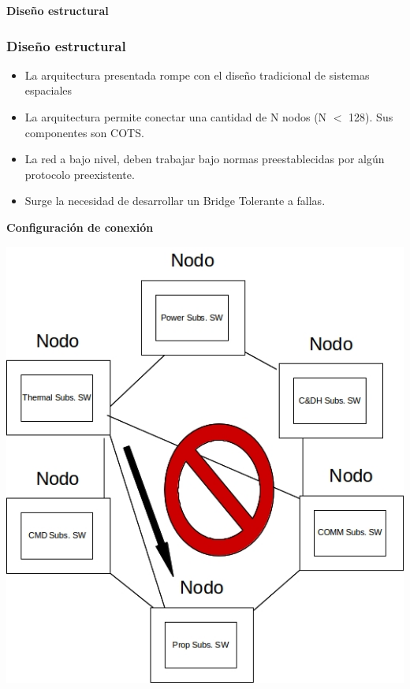 \begin{frame}[c]
	\centering
	\LARGE \textbf{Diseño estructural}
\end{frame}

\begin{frame}
	\frametitle{Diseño estructural}
	\begin{itemize}
		\item La arquitectura presentada rompe con el diseño tradicional de sistemas espaciales
		\item La arquitectura permite conectar una cantidad de N nodos (N $<$ 128). Sus componentes son COTS. 
		\item La red a bajo nivel, deben trabajar bajo normas preestablecidas por algún protocolo preexistente. 
		\item Surge la necesidad de desarrollar un Bridge Tolerante a fallas. 
	\end{itemize}
\end{frame}

\begin{frame}[c]
	\centering
	\LARGE \textbf{Configuración de conexión}
\end{frame}

\begin{frame}[c]
	\centering
	\includegraphics[scale=0.4]{images/Bridge1.jpg}
\end{frame}

